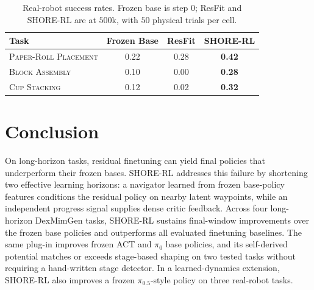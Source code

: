 \documentclass[letterpaper]{article} %
\begin{document}
\begin{table}[!t]
\centering\small\setlength{\tabcolsep}{4pt}
\begin{tabular}{@{}lccc@{}}
\toprule
Task & Frozen Base & ResFit & \textbf{SHORE-RL} \\
\midrule
\textsc{Paper-Roll Placement} & 0.22 & 0.28 & \textbf{0.42} \\
\textsc{Block Assembly}       & 0.10 & 0.00 & \textbf{0.28} \\
\textsc{Cup Stacking}         & 0.12 & 0.02 & \textbf{0.32} \\
\bottomrule
\end{tabular}
\caption{Real-robot success rates. Frozen base is step $0$; ResFit and SHORE-RL are at $500$k, with $50$ physical trials per cell.}
\label{tab:realrobot}
\end{table}

\section{Conclusion}
On long-horizon tasks, residual finetuning can yield final policies that  underperform their frozen bases. SHORE-RL addresses this failure by shortening  two effective learning horizons: a navigator learned from frozen base-policy  features conditions the residual policy on nearby latent waypoints, while an  independent progress signal supplies dense critic feedback. Across four  long-horizon DexMimGen tasks, SHORE-RL sustains final-window improvements over  the frozen base policies and outperforms all evaluated finetuning baselines.  The same plug-in improves frozen ACT and $\pi_0$ base policies, and its self-derived potential matches or exceeds stage-based shaping on two tested  tasks without requiring a hand-written stage detector. In a learned-dynamics extension, SHORE-RL also improves a frozen $\pi_{0.5}$-style policy on three real-robot tasks.
\clearpage

\end{document}
